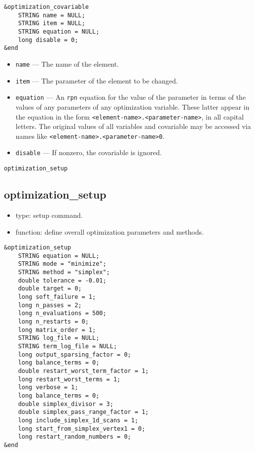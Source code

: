 \documentclass[11pt]{article}
\begin{document}
\begin{verbatim}
&optimization_covariable
    STRING name = NULL;
    STRING item = NULL;
    STRING equation = NULL;
    long disable = 0;
&end
\end{verbatim}

\begin{itemize}
\item \verb|name| --- The name of the element.
\item \verb|item| --- The parameter of the element to be changed.
\item \verb|equation| --- An {\tt rpn} equation for the value of the parameter in terms of the
values of any parameters of any optimization variable.  These latter appear in the equation in the
form \verb|<element-name>.<parameter-name>|, in all capital letters.  The original values of all
variables and covariable may be accessed via names like \verb|<element-name>.<parameter-name>0|.
\item \verb|disable| --- If nonzero, the covariable is ignored.
\end{itemize}

\begin{latexonly}
\newpage
\begin{center}{\Large\verb|optimization_setup|}\end{center}
\end{latexonly}
\subsection{optimization\_setup \label{subsec:optimizationsetup}}

\begin{itemize}
\item type: setup command.
\item function: define overall optimization parameters and methods.
\end{itemize}

\begin{verbatim}
&optimization_setup
    STRING equation = NULL;
    STRING mode = "minimize";
    STRING method = "simplex";
    double tolerance = -0.01;
    double target = 0;
    long soft_failure = 1;
    long n_passes = 2;
    long n_evaluations = 500; 
    long n_restarts = 0;
    long matrix_order = 1;
    STRING log_file = NULL;
    STRING term_log_file = NULL;
    long output_sparsing_factor = 0;
    long balance_terms = 0;
    double restart_worst_term_factor = 1;
    long restart_worst_terms = 1;
    long verbose = 1;
    long balance_terms = 0;
    double simplex_divisor = 3;
    double simplex_pass_range_factor = 1;
    long include_simplex_1d_scans = 1;
    long start_from_simplex_vertex1 = 0;
    long restart_random_numbers = 0;
&end
\end{verbatim}
\end{document}
